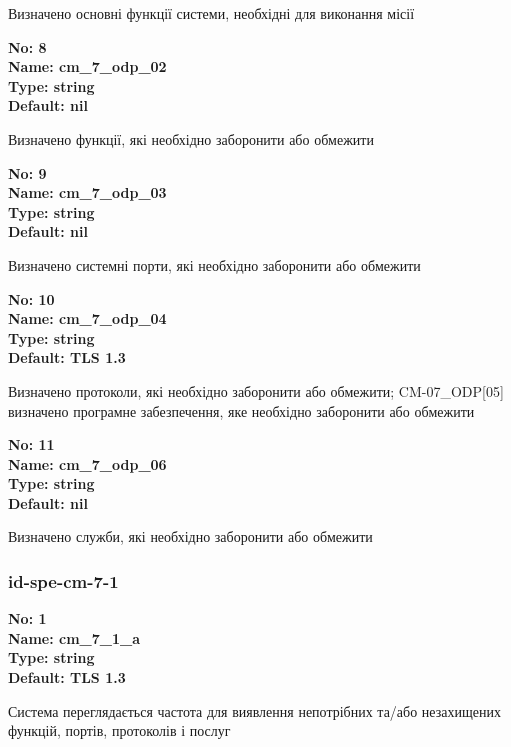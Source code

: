\documentclass{article}
\begin{document}
{\footnotesize Визначено основні функції системи, необхідні для виконання місії}


{\footnotesize\bfseries
No: 8\\
Name: cm\_\allowbreak{}7\_\allowbreak{}odp\_\allowbreak{}02\\
Type: string\\
Default: nil
}

{\footnotesize Визначено функції, які необхідно заборонити або обмежити}


{\footnotesize\bfseries
No: 9\\
Name: cm\_\allowbreak{}7\_\allowbreak{}odp\_\allowbreak{}03\\
Type: string\\
Default: nil
}

{\footnotesize Визначено системні порти, які необхідно заборонити або обмежити}


{\footnotesize\bfseries
No: 10\\
Name: cm\_\allowbreak{}7\_\allowbreak{}odp\_\allowbreak{}04\\
Type: string\\
Default: \textquotedbl{}TLS 1.3\textquotedbl{}
}

{\footnotesize Визначено протоколи, які необхідно заборонити або обмежити; CM-07\_\allowbreak{}ODP[05] визначено програмне забезпечення, яке необхідно заборонити або обмежити}


{\footnotesize\bfseries
No: 11\\
Name: cm\_\allowbreak{}7\_\allowbreak{}odp\_\allowbreak{}06\\
Type: string\\
Default: nil
}

{\footnotesize Визначено служби, які необхідно заборонити або обмежити}




\subsubsection{id-spe-cm-7-1}


\vspace{10pt}
{\footnotesize\bfseries
No: 1\\
Name: cm\_\allowbreak{}7\_\allowbreak{}1\_\allowbreak{}a\\
Type: string\\
Default: \textquotedbl{}TLS 1.3\textquotedbl{}
}

{\footnotesize Система переглядається частота для виявлення непотрібних та/або незахищених функцій, портів, протоколів і послуг}
\end{document}
